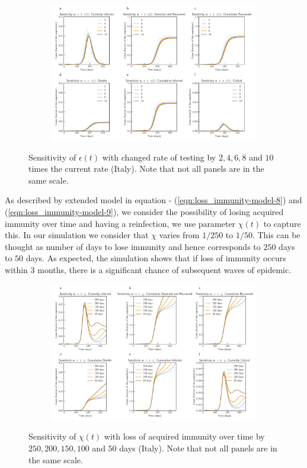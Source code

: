 \documentclass[fleqn,10pt]{wlscirep}
\begin{document}
\begin{figure}[t!]
	\centering
	\begin{subfigure}[b]{\textwidth}
		\centering
		\includegraphics[width=1\linewidth]{Italy_sensitivity_epsilon.pdf}
	\end{subfigure}
	\caption{Sensitivity of $\epsilon(t)$ with changed rate of testing by $2, 4, 6, 8$ and $10$ times the current rate (Italy). Note that not all panels are in the same scale.}
	\label{fig3B} 
\end{figure}
%
As described by extended model in equation - (\ref{eqn:loss_immunity-model-8}) and (\ref{eqn:loss_immunity-model-9}), we consider the possibility of losing acquired immunity over time and having a reinfection, we use parameter $\chi(t)$ to capture this. In our simulation we consider that $\chi$ varies from $1/250$ to $1/50$. This can be thought as number of days to lose immunity and hence corresponds to $250$ days to $50$ days. As expected, the simulation shows that if loss of immunity occurs within 3 months, there is a significant chance of subsequent waves of epidemic.  

%
\begin{figure}[t!]
	\centering
	\begin{subfigure}[b]{\textwidth}
		\centering
		\includegraphics[width=1\linewidth]{Italy_scenario_reinfection.pdf}
	\end{subfigure}
	\caption{Sensitivity of $\chi(t)$ with loss of acquired immunity over time by $250, 200, 150, 100$ and $50$ days (Italy). Note that not all panels are in the same scale.}
	\label{fig4} 
\end{figure}
%
\end{document}
